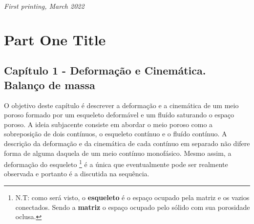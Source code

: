 \documentclass[
	11pt, %
	fleqn, %
	a4paper, %
]{LegrandOrangeBook}
\begin{document}
\noindent \textit{First printing, March 2022} %


\pagestyle{empty} %

\tableofcontents %

\listoffigures %

\listoftables %

\pagestyle{fancy} %

\cleardoublepage %


\part{Part One Title}


\chapterspaceabove{6.75cm} %
\chapterspacebelow{7.25cm} %


\chapter{Capítulo 1 - Deformação e Cinemática. Balanço de massa}

O objetivo deste capítulo é descrever a deformação e a cinemática de um meio poroso formado por um esqueleto deformável e um fluído saturando o espaço poroso. A ideia subjacente consiste em abordar o meio poroso como a sobreposição de dois contínuos, o esqueleto contínuo e o fluído contínuo. A descrição da deformação e da cinemática de cada contínuo em separado não difere forma de alguma daquela de um meio contínuo monofásico. Mesmo assim, a deformação do esqueleto \footnote{N.T: como será visto, o \textbf{esqueleto} é o espaço ocupado pela matriz e os vazios conectados. Sendo a \textbf{matriz} o espaço ocupado pelo sólido com sua porosidade oclusa.} é a única que eventualmente pode ser realmente observada e portanto é a discutida na sequência.
\end{document}
